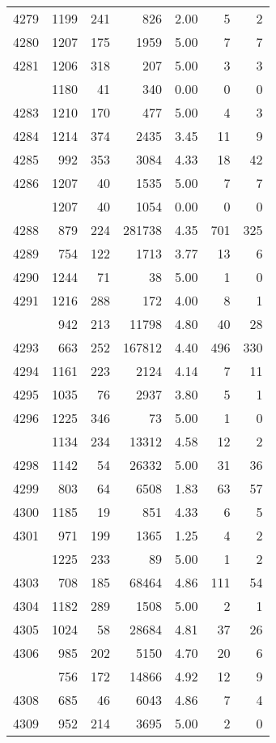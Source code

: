 \documentclass[
]{article}
\begin{document}
\begin{table}
\begin{tabular}[t]{lrrrrrr}
4279 & 1199 & 241 & 826 & 2.00 & 5 & 2\\
4280 & 1207 & 175 & 1959 & 5.00 & 7 & 7\\
4281 & 1206 & 318 & 207 & 5.00 & 3 & 3\\
\addlinespace
4282 & 1180 & 41 & 340 & 0.00 & 0 & 0\\
4283 & 1210 & 170 & 477 & 5.00 & 4 & 3\\
4284 & 1214 & 374 & 2435 & 3.45 & 11 & 9\\
4285 & 992 & 353 & 3084 & 4.33 & 18 & 42\\
4286 & 1207 & 40 & 1535 & 5.00 & 7 & 7\\
\addlinespace
4287 & 1207 & 40 & 1054 & 0.00 & 0 & 0\\
4288 & 879 & 224 & 281738 & 4.35 & 701 & 325\\
4289 & 754 & 122 & 1713 & 3.77 & 13 & 6\\
4290 & 1244 & 71 & 38 & 5.00 & 1 & 0\\
4291 & 1216 & 288 & 172 & 4.00 & 8 & 1\\
\addlinespace
4292 & 942 & 213 & 11798 & 4.80 & 40 & 28\\
4293 & 663 & 252 & 167812 & 4.40 & 496 & 330\\
4294 & 1161 & 223 & 2124 & 4.14 & 7 & 11\\
4295 & 1035 & 76 & 2937 & 3.80 & 5 & 1\\
4296 & 1225 & 346 & 73 & 5.00 & 1 & 0\\
\addlinespace
4297 & 1134 & 234 & 13312 & 4.58 & 12 & 2\\
4298 & 1142 & 54 & 26332 & 5.00 & 31 & 36\\
4299 & 803 & 64 & 6508 & 1.83 & 63 & 57\\
4300 & 1185 & 19 & 851 & 4.33 & 6 & 5\\
4301 & 971 & 199 & 1365 & 1.25 & 4 & 2\\
\addlinespace
4302 & 1225 & 233 & 89 & 5.00 & 1 & 2\\
4303 & 708 & 185 & 68464 & 4.86 & 111 & 54\\
4304 & 1182 & 289 & 1508 & 5.00 & 2 & 1\\
4305 & 1024 & 58 & 28684 & 4.81 & 37 & 26\\
4306 & 985 & 202 & 5150 & 4.70 & 20 & 6\\
\addlinespace
4307 & 756 & 172 & 14866 & 4.92 & 12 & 9\\
4308 & 685 & 46 & 6043 & 4.86 & 7 & 4\\
4309 & 952 & 214 & 3695 & 5.00 & 2 & 0\\

\end{tabular}
\end{table}
\end{document}
